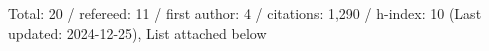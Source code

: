 Total: 20 / refereed: 11 / first author: 4 / citations: 1,290 / h-index: 10 (Last updated: 2024-12-25), List attached below